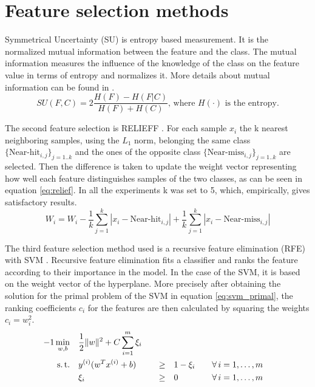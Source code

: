 \documentclass[twoside,11pt]{article}
\begin{document}
\section{Feature selection methods}

Symmetrical Uncertainty (SU) \citep{press1996numerical} is entropy based measurement. It is the normalized mutual information between the feature and the class. The mutual information measures the influence of the knowledge of the class on the feature value in terms of entropy and normalizes it. More details about mutual information can be found in \cite{paninski2003estimation}.
\begin{equation}
  \label{eq:su}
  SU(F,C) = 2 \frac{H(F) - H(F|C)}{H(F) + H(C)} \textrm{, where } H(\cdot) \textrm{ is the entropy.}
\end{equation}

The second feature selection is RELIEFF \citep{kononenko1997overcoming}. For each sample $x_i$ the k nearest neighboring samples, using the $L_1$ norm, belonging the same class $\{\textrm{Near-hit}_{i, j}\}_{j=1..k}$ and the ones of the opposite class $\{\textrm{Near-miss}_{i, j}\}_{j=1..k}$ are selected. Then the difference is taken to update the weight vector representing how well each feature distinguishes samples of the two classes, as can be seen in equation \ref{eq:relief}. In all the experiments k was set to 5, which, empirically, gives satisfactory results.
\begin{equation}
  \label{eq:relief}
  W_i = W_i - \frac{1}{k}\sum_{j=1}^{k}|x_i - \textrm{Near-hit}_{i,j}| + \frac{1}{k}\sum_{j=1}^{k} |x_i - \textrm{Near-miss}_{i,j}|
\end{equation}

The third feature selection method used is a recursive feature elimination (RFE) with SVM \citep{guyon2002gene}. Recursive feature elimination fits a classifier and ranks the feature according to their importance in the model. In the case of the SVM, it is based on the weight vector of the hyperplane. More precisely after obtaining the solution for the primal problem of the SVM in equation \ref{eq:svm_primal}, the ranking coefficients $c_i$ for the features are then calculated by squaring the weights $c_i = w_i^2$.
\begin{alignat}{-1}
     \min_{w,b}  & \quad \frac12\|w\|^2 + C\sum_{i=1}^m \xi_i & & & \label{eq:svm_primal} \\ 
   \text{s.\,t.} & \quad y^{(i)} (w^Tx^{(i)} + b) & \quad \geq & \quad 1 -\xi_i &&
                   \quad \forall \, i = 1, \ldots, m \nonumber \\
                 & \quad \xi_i                  & \quad \geq & \quad 0 &&
                   \quad \forall \, i = 1, \ldots, m \nonumber 
\end{alignat}
\end{document}
